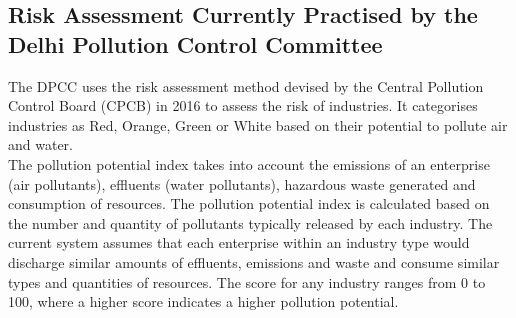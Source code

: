 \documentclass[a4paper, 12pt, twoside]{article}
\begin{document}
                 \subsection{Risk Assessment Currently Practised by the Delhi Pollution Control Committee}
                 
                 The DPCC uses the risk assessment method devised by the Central Pollution Control Board (CPCB) in 2016 to assess the risk of industries. It categorises industries as Red, Orange, Green or White based on their potential to pollute air and water. \\
                 
                 The pollution potential index takes into account the emissions of an enterprise (air pollutants), effluents (water pollutants), hazardous waste generated and consumption of resources. The pollution potential index is calculated based on the number and quantity of pollutants typically released by each industry. The current system assumes that each enterprise within an industry type would discharge similar amounts of effluents, emissions and waste and consume similar types and quantities of resources. The score for any industry ranges from 0 to 100, where a higher score indicates a higher pollution potential. \\
                 
\end{document}
